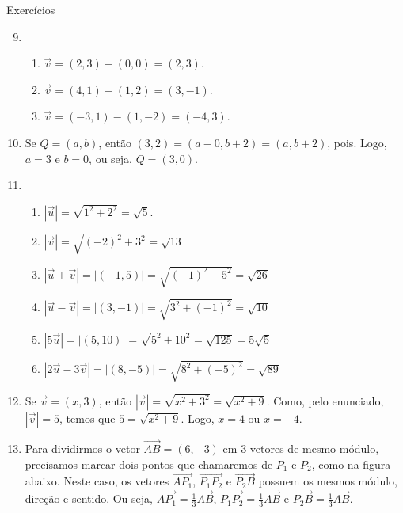 \clearmargin

\begin{answer}{Exercícios}
{\exerciselist
\begin{enumerate}\setcounter{enumi}{8}
\item 
\begin{enumerate}
\item {} 
\(\vec{v}=(2,3)-(0,0)=(2,3)\).

\item {} 
\(\vec{v}=(4,1)-(1,2)=(3,-1)\).

\item {} 
\(\vec{v}=(-3,1)-(1,-2)=(-4,3)\).

\end{enumerate}

\item Se \(Q=(a,b)\), então \((3,2)=(a-0, b+2)=(a,b+2)\), pois. Logo, \(a=3\) e \(b =0\), ou seja, \(Q=(3,0)\).

\item 
\begin{enumerate}
\item {} 
\(|\vec{u}|=\sqrt{1^2+2^2}=\sqrt{5}\).

\item {} 
\(|\vec{v}|=\sqrt{(-2)^2+3^2}=\sqrt{13}\)

\item {} 
\(|\vec{u}+\vec{v}|=|(-1,5)|=\sqrt{(-1)^2+5^2}=\sqrt{26}\)

\item {} 
\(|\vec{u}-\vec{v}|=|(3,-1)|=\sqrt{3^2+(-1)^2}=\sqrt{10}\)

\item {} 
\(|5\vec{u}|=|(5,10)|=\sqrt{5^2+10^2}=\sqrt{125}=5\sqrt{5}\)

\item {} 
\(|2\vec{u}-3\vec{v}|=|(8,-5)|=\sqrt{8^2+(-5)^2}=\sqrt{89}\)

\end{enumerate}

\item Se \(\vec{v}=(x,3)\), então \(|\vec{v}|=\sqrt{x^2+3^2}=\sqrt{x^2+9}\). Como, pelo enunciado, \(|\vec{v}|=5\), temos que \(5=\sqrt{x^2+9}\). Logo, \(x=4\) ou \(x=-4\).

\item Para dividirmos o vetor \(\overrightarrow{AB}=(6,-3)\) em 3 vetores de mesmo módulo, precisamos marcar dois pontos que chamaremos de \(P_1\) e \(P_2\), como na figura abaixo. Neste caso, os vetores \(\overrightarrow{AP_1}\), \(\overrightarrow{P_1P_2}\) e \(\overrightarrow{P_2B}\) possuem os mesmos módulo, direção e sentido. Ou seja, \(\overrightarrow{AP_1}=\frac13\overrightarrow{AB}\),  \(\overrightarrow{P_1P_2}=\frac13\overrightarrow{AB}\) e \(\overrightarrow{P_2B}=\frac13\overrightarrow{AB}\).


\end{enumerate}}
\end{answer}
